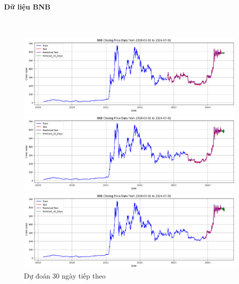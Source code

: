 \documentclass[conference]{IEEEtran}
\begin{document}
	\paragraph{\textbf{Dữ liệu BNB}} \mbox{} \\
	\begin{figure}[H]
		\centering
		\begin{minipage}{0.15\textwidth}
			\centering
			
			\includegraphics[width=1\textwidth]{Figure/RandomForest_BNB_30days_73.png}
		\end{minipage}
		\hfill
		\begin{minipage}{0.15\textwidth}
			\centering
			\includegraphics[width=1\textwidth]{Figure/RandomForest_BNB_30days_82.png}
		\end{minipage}
		\hfill
		\begin{minipage}{0.15\textwidth}
			\centering
			\includegraphics[width=1\textwidth]{Figure/RandomForest_BNB_30days_91.png}
		\end{minipage}
		\caption{Dự đoán 30 ngày tiếp theo}
		\label{fig:1}
	\end{figure}
	
\end{document}
